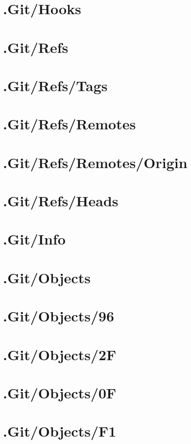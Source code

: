 \section*{.Git/Hooks}

\section*{.Git/Refs}

\section*{.Git/Refs/Tags}

\section*{.Git/Refs/Remotes}

\section*{.Git/Refs/Remotes/Origin}

\section*{.Git/Refs/Heads}

\section*{.Git/Info}

\section*{.Git/Objects}

\section*{.Git/Objects/96}

\section*{.Git/Objects/2F}

\section*{.Git/Objects/0F}

\section*{.Git/Objects/F1}

